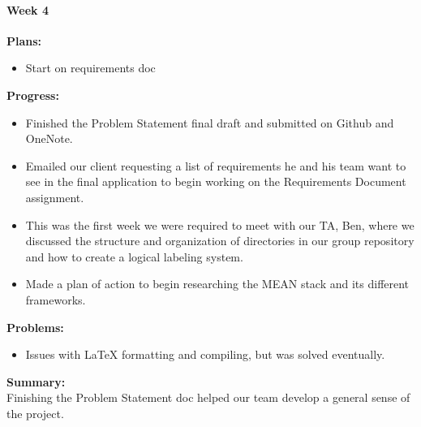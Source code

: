 \paragraph{Week 4}
\begin{adjustwidth}{2.5em}{0pt}
    \vspace{-0.5cm}\textbf{Plans:}
    \vspace{-0.5cm}
    \begin{itemize}
		\item Start on requirements doc
    \end{itemize} 
    \vspace{-0.3cm}\textbf{Progress:}
    \vspace{-0.5cm}
    \begin{itemize}
        \item Finished the Problem Statement final draft and submitted on Github and OneNote. 
        \item Emailed our client requesting a list of requirements he and his team want to see in the final application to begin working on the Requirements Document assignment.
        \item This was the first week we were required to meet with our TA, Ben, where we discussed the structure and organization of directories in our group repository and how to create a logical labeling system. 
        \item Made a plan of action to begin researching the MEAN stack and its different frameworks.  
		\end{itemize} 
    \vspace{-0.3cm}\textbf{Problems:}
    \vspace{-0.5cm}
    \begin{itemize}
        \item Issues with LaTeX formatting and compiling, but was solved eventually. 
    \end{itemize}  
    \vspace{-0.3cm}\noindent\textbf{Summary:}\\
    \noindent Finishing the Problem Statement doc helped our team develop a general sense of the project. 
\end{adjustwidth} 
